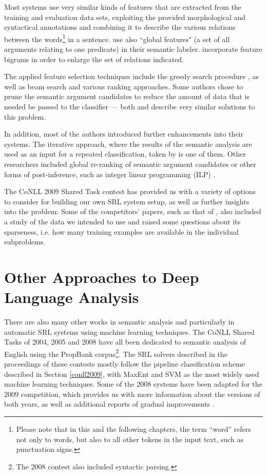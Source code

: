 \documentclass[12pt,notitlepage]{report}
\begin{document}
Most systems use very similar kinds of features that are extracted from the training and evaluation data sets, exploiting the provided morphological and syntactical annotations and combining it to describe the various relations between the words\footnote{Please note that in this and the following chapters, the term ``word'' refers not only to words, but also to all other tokens in the input text, such as punctuation signs.} in a sentence. \citet{asahara09} use also ``global features" (a set of all arguments relating to one predicate) in their semantic labeler. \citet{nugues09} incorporate feature bigrams in order to enlarge the set of relations indicated. 

The applied feature selection techniques include the greedy search procedure \citep[among others]{nugues09,zeman09}, as well as beam search \citep[][and others]{merlo09,nugues09} and various ranking approaches. Some authors chose to prune the semantic argument candidates to reduce the amount of data that is needed be passed to the classifier --- both \citet{zhao09} and \citet{asahara09} describe very similar solutions to this problem.

In addition, most of the authors introduced further enhancements into their systems. The iterative approach, where the results of the semantic analysis are used as an input for a repeated classification, taken by \citet{chen09} is one of them. Other researchers included global re-ranking of semantic argument candidates \citep{nugues09} or other forms of post-inference, such as integer linear programming (ILP)  \citep{che09}.

The CoNLL 2009 Shared Task contest has provided us with a variety of options to consider for building our own SRL system setup, as well as further insights into the problem: Some of the competitors' papers, such as that of \citet{zeman09}, also included a study of the data we intended to use and raised some questions about its sparseness, i.e. how many training examples are available in the individual subproblems.

\section{Other Approaches to Deep Language Analysis}\label{related-other}

There are also many other works in semantic analysis and particularly in automatic SRL systems using machine learning techniques. The CoNLL Shared Tasks of 2004, 2005 \citep{carreras04,carreras05} and 2008 \citep{surdeanu08} have all been dedicated to semantic analysis of English using the PropBank corpus\footnote{The 2008 contest also included syntactic parsing.}. The SRL solvers described in the proceedings of these contests mostly follow the pipeline classification scheme described in Section \ref{conll2009}, with MaxEnt and SVM as the most widely used machine learning techniques. Some of the 2008 systems have been adapted for the 2009 competition, which provides us with more information about the versions of both years, as well as additional reports of gradual improvements \citep{che08,chen08}.
\end{document}
